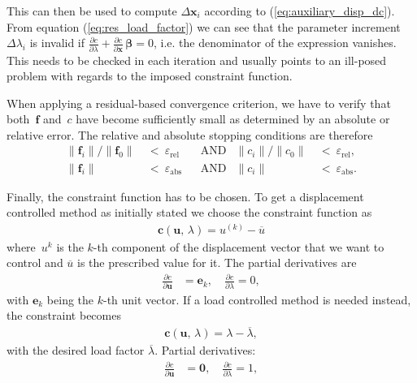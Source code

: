 This can then be used to compute $\Delta\boldsymbol{x}_{i}$ according to (\ref{eq:auxiliary_disp_dc}).
From equation (\ref{eq:res_load_factor}) we can see that the parameter increment $\Delta \lambda_{i}$ is invalid if $\frac{\partial c}{\partial \lambda} + \frac{\partial c}{\partial \boldsymbol{x}}\,\boldsymbol{\beta} = 0$, i.e. the denominator of the expression vanishes.
This needs to be checked in each iteration and usually points to an ill-posed problem with regards to the imposed constraint function.

When applying a residual-based convergence criterion, we have to verify that both~$\boldsymbol{f}$ and~$c$ have become sufficiently small as determined by an absolute or relative error.
The relative and absolute stopping conditions are therefore
%
\begin{align}
\lVert \boldsymbol{f}_{i} \rVert / \lVert \boldsymbol{f}_{0} \rVert \ &< \ \varepsilon_{\mathrm{rel}} & &\mathrm{AND} & \lVert c_{i} \rVert / \lVert c_{0} \rVert \ &< \ \varepsilon_{\mathrm{rel}}, \\
\lVert \boldsymbol{f}_{i} \rVert \ &< \ \varepsilon_{\mathrm{abs}} & &\mathrm{AND} & \lVert c_{i} \rVert \ &< \ \varepsilon_{\mathrm{abs}}.
\end{align}

Finally, the constraint function has to be chosen.
To get a displacement controlled method as initially stated we choose the constraint function as
%
\begin{align}
\boldsymbol{c}(\boldsymbol{u},\,\lambda) = u^{(k)} - \overline{u}
\end{align}
%
where~$u^k$ is the $k$-th component of the displacement vector that we want to control and $\overline{u}$ is the prescribed value for it. The partial derivatives are
%
\begin{align*}
\frac{\partial c}{\partial \boldsymbol{u}} &= \boldsymbol{e}_k,\quad
\frac{\partial c}{\partial \lambda} = 0,
\end{align*}
%
with $\boldsymbol{e}_k$ being the $k$-th unit vector.
If a load controlled method is needed instead, the constraint becomes
%
\begin{align}
\boldsymbol{c}(\boldsymbol{u},\,\lambda) = \lambda - \overline{\lambda},
\end{align}
%
with the desired load factor $\overline{\lambda}$. Partial derivatives:
%
\begin{align*}
\frac{\partial c}{\partial \boldsymbol{u}} &= \boldsymbol{0},\quad
\frac{\partial c}{\partial \lambda} = 1,
\end{align*}

